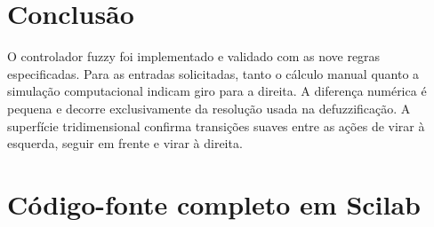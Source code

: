 \documentclass[12pt,a4paper]{article}
\begin{document}
\section{Conclusão}

O controlador fuzzy foi implementado e validado com as nove regras especificadas. Para as entradas solicitadas, tanto o cálculo manual quanto a simulação computacional indicam giro para a direita. A diferença numérica é pequena e decorre exclusivamente da resolução usada na defuzzificação. A superfície tridimensional confirma transições suaves entre as ações de virar à esquerda, seguir em frente e virar à direita.

\clearpage
\appendix
\section{Código-fonte completo em Scilab}


\end{document}
